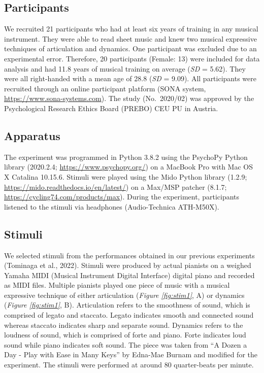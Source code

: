 \documentclass[
  man,floatsintext]{apa6}
\begin{document}
\hypertarget{participants}{%
\subsection{Participants}\label{participants}}

We recruited 21 participants who had at least six years of training in any musical instrument. They were able to read sheet music and knew two musical expressive techniques of articulation and dynamics. One participant was excluded due to an experimental error. Therefore, 20 participants (Female: 13) were included for data analysis and had 11.8 years of musical training on average (\emph{SD} = 5.62). They were all right-handed with a mean age of 28.8 (\emph{SD} = 9.09). All participants were recruited through an online participant platform (SONA system, \url{https://www.sona-systems.com}). The study (No.~2020/02) was approved by the Psychological Research Ethics Board (PREBO) CEU PU in Austria.

\hypertarget{apparatus}{%
\subsection{Apparatus}\label{apparatus}}

The experiment was programmed in Python 3.8.2 using the PsychoPy Python library (2020.2.4; \url{https://www.psychopy.org/}) on a MacBook Pro with Mac OS X Catalina 10.15.6. Stimuli were played using the Mido Python library (1.2.9; \url{https://mido.readthedocs.io/en/latest/}) on a Max/MSP patcher (8.1.7; \url{https://cycling74.com/products/max}). During the experiment, participants listened to the stimuli via headphones (Audio-Technica ATH-M50X).

\hypertarget{stimuli}{%
\subsection{Stimuli}\label{stimuli}}

We selected stimuli from the performances obtained in our previous experiments (Tominaga et al., 2022). Stimuli were produced by actual pianists on a weighed Yamaha MIDI (Musical Instrument Digital Interface) digital piano and recorded as MIDI files. Multiple pianists played one piece of music with a musical expressive technique of either articulation (\emph{Figure \ref{fig:stim1}}, A) or dynamics (\emph{Figure \ref{fig:stim1}}, B). Articulation refers to the smoothness of sound, which is comprised of legato and staccato. Legato indicates smooth and connected sound whereas staccato indicates sharp and separate sound. Dynamics refers to the loudness of sound, which is comprised of forte and piano. Forte indicates loud sound while piano indicates soft sound. The piece was taken from ``A Dozen a Day - Play with Ease in Many Keys'' by Edna-Mae Burnam and modified for the experiment. The stimuli were performed at around 80 quarter-beats per minute.
\end{document}
